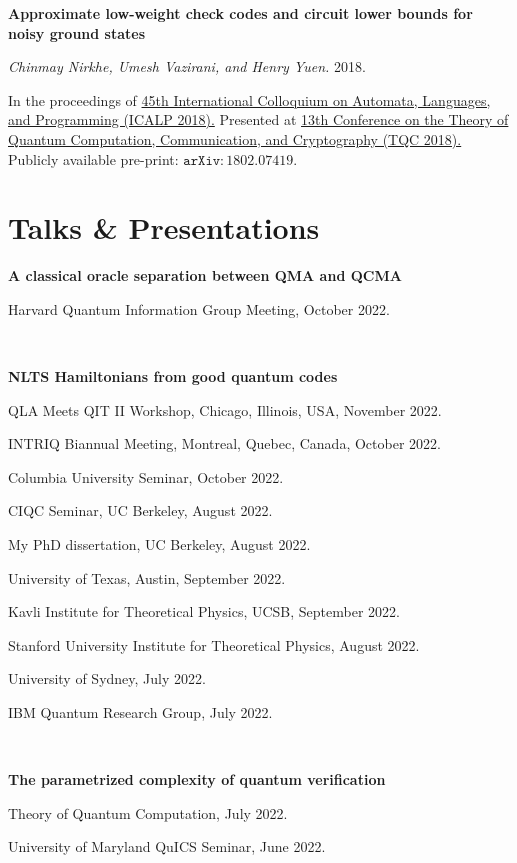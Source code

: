 \documentclass[11pt]{article}
\begin{document}
\begin{enumerate}[{leftmargin=*,start=11,label=[\arabic*]\addtocounter{enumi}{-2}}]
\item \textbf{Approximate low-weight check codes and circuit lower bounds for noisy ground states}

\emph{Chinmay Nirkhe, Umesh Vazirani, and Henry Yuen.} 2018.

In the proceedings of \href{http://drops.dagstuhl.de/opus/volltexte/2018/9095/}{45th International Colloquium on Automata, Languages, and Programming (ICALP 2018).} 
Presented at \href{https://www.tqc2018.org/}{13th Conference on the Theory of Quantum Computation, Communication, and Cryptography (TQC 2018).}
Publicly available pre-print: \href{https://arxiv.org/abs/1802.07419}{$\mathtt{arXiv:1802.07419}$}.

\end{enumerate}


\section{Talks \& Presentations}

\textbf{A classical oracle separation between QMA and QCMA}

Harvard Quantum Information Group Meeting, October 2022.

\

\textbf{NLTS Hamiltonians from good quantum codes}

QLA Meets QIT II Workshop, Chicago, Illinois, USA, November 2022.

INTRIQ Biannual Meeting, Montreal, Quebec, Canada, October 2022.

Columbia University Seminar, October 2022.

CIQC Seminar, UC Berkeley, August 2022.

My PhD dissertation, UC Berkeley, August 2022.

University of Texas, Austin, September 2022.

Kavli Institute for Theoretical Physics, UCSB, September 2022.

Stanford University Institute for Theoretical Physics, August 2022.

University of Sydney, July 2022.

IBM Quantum Research Group, July 2022.

\

\textbf{The parametrized complexity of quantum verification}

Theory of Quantum Computation, July 2022.

University of Maryland QuICS Seminar, June 2022.
\end{document}
